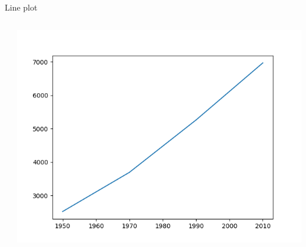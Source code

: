 \begin{frame}[t, fragile]{Line plot}
  \begin{columns}
    \begin{column}{0.5\textwidth}
          
    \end{column}

    \begin{column}{0.5\textwidth}
      \begin{center}
        \includegraphics[scale=.40]{aula-2/figuras/matplotlib-lineplot-1.png}
      \end{center}
    \end{column}
  \end{columns}
\end{frame}
%

 